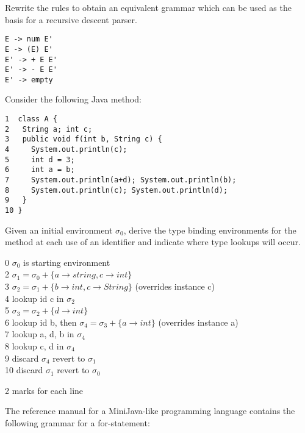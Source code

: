\documentclass[11pt]{bareexam}
\begin{document}
\begin{questions}
\begin{subquestions}
\begin{subsubquestions}
\subsubquestion
Rewrite the rules to obtain an equivalent grammar which can
be used as the basis for a recursive descent parser.

\begin{modelanswer}
\begin{verbatim}
E -> num E'
E -> (E) E'
E' -> + E E'
E' -> - E E'
E' -> empty
\end{verbatim}
\end{modelanswer}

\end{subsubquestions}

\subquestion
Consider the following Java method:
\begin{verbatim}
1  class A {
2   String a; int c;
3   public void f(int b, String c) {
4     System.out.println(c);
5     int d = 3;
6     int a = b;
7     System.out.println(a+d); System.out.println(b);
8     System.out.println(c); System.out.println(d);
9   }
10 }
\end{verbatim}
Given an initial environment $\sigma_0$, 
derive the type binding environments for the method at each
use of an identifier and indicate where type lookups will occur.

\begin{modelanswer}
0  $\sigma_0$ is starting environment\\
2  $\sigma_1 = \sigma_0 + \{a\rightarrow string,c\rightarrow int\}$\\
3  $\sigma_2 = \sigma_1 + \{b\rightarrow int,c\rightarrow String\}$ (overrides instance c)\\
4  lookup id c  in $\sigma_2$\\
5  $\sigma_3 = \sigma_2 + \{d\rightarrow int\}$ \\
6  lookup id b, then $\sigma_4 = \sigma_3 + \{a\rightarrow int\}$ (overrides instance a)\\
7  lookup a, d, b  in $\sigma_4$\\
8  lookup c, d in $\sigma_4$\\
9  discard $\sigma_4$ revert to $\sigma_1$\\
10 discard $\sigma_1$ revert to $\sigma_0$
\end{modelanswer}

2 marks for each line

\end{subquestions}

\newpage

\question

The reference manual for a MiniJava-like programming language contains
the following grammar for a for-statement: 


\end{questions}
\end{document}

